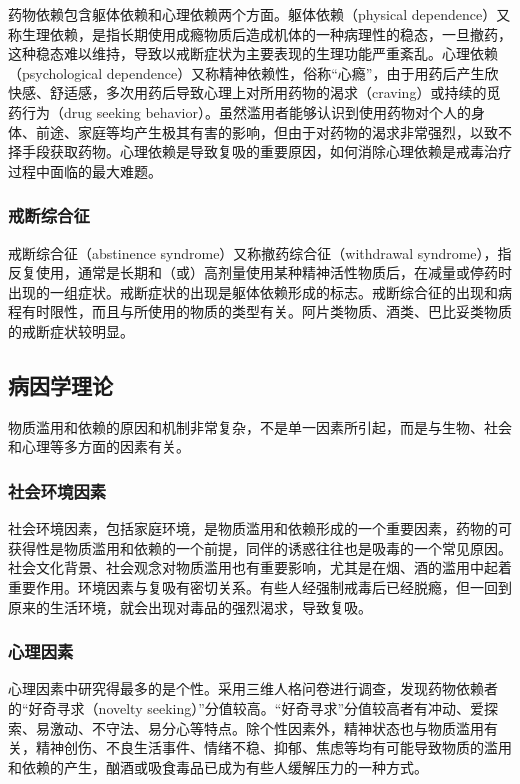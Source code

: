 药物依赖包含躯体依赖和心理依赖两个方面。躯体依赖（physical
dependence）又称生理依赖，是指长期使用成瘾物质后造成机体的一种病理性的稳态，一旦撤药，这种稳态难以维持，导致以戒断症状为主要表现的生理功能严重紊乱。心理依赖（psychological
dependence）又称精神依赖性，俗称“心瘾”，由于用药后产生欣快感、舒适感，多次用药后导致心理上对所用药物的渴求（craving）或持续的觅药行为（drug
seeking
behavior）。虽然滥用者能够认识到使用药物对个人的身体、前途、家庭等均产生极其有害的影响，但由于对药物的渴求非常强烈，以致不择手段获取药物。心理依赖是导致复吸的重要原因，如何消除心理依赖是戒毒治疗过程中面临的最大难题。

\subsubsection{戒断综合征}

戒断综合征（abstinence syndrome）又称撤药综合征（withdrawal
syndrome），指反复使用，通常是长期和（或）高剂量使用某种精神活性物质后，在减量或停药时出现的一组症状。戒断症状的出现是躯体依赖形成的标志。戒断综合征的出现和病程有时限性，而且与所使用的物质的类型有关。阿片类物质、酒类、巴比妥类物质的戒断症状较明显。

\subsection{病因学理论}

物质滥用和依赖的原因和机制非常复杂，不是单一因素所引起，而是与生物、社会和心理等多方面的因素有关。

\subsubsection{社会环境因素}

社会环境因素，包括家庭环境，是物质滥用和依赖形成的一个重要因素，药物的可获得性是物质滥用和依赖的一个前提，同伴的诱惑往往也是吸毒的一个常见原因。社会文化背景、社会观念对物质滥用也有重要影响，尤其是在烟、酒的滥用中起着重要作用。环境因素与复吸有密切关系。有些人经强制戒毒后已经脱瘾，但一回到原来的生活环境，就会出现对毒品的强烈渴求，导致复吸。

\subsubsection{心理因素}

心理因素中研究得最多的是个性。采用三维人格问卷进行调查，发现药物依赖者的“好奇寻求（novelty
seeking）”分值较高。“好奇寻求”分值较高者有冲动、爱探索、易激动、不守法、易分心等特点。除个性因素外，精神状态也与物质滥用有关，精神创伤、不良生活事件、情绪不稳、抑郁、焦虑等均有可能导致物质的滥用和依赖的产生，酗酒或吸食毒品已成为有些人缓解压力的一种方式。

